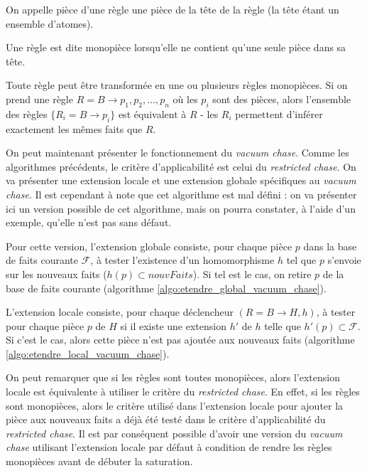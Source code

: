 \begin{definition}\label{def:piece_regle}
    On appelle pièce d’une règle une pièce de la tête de la règle (la tête étant un ensemble d'atomes).
    \par Une règle est dite monopièce lorsqu'elle ne contient qu'une seule pièce dans sa tête.
    \par Toute règle peut être transformée en une ou plusieurs règles monopièces. Si on prend une règle $R = B \rightarrow p_1, p_2, \ldots, p_n$ où les $p_i$ sont des pièces, alors l'ensemble des règles $\{R_i = B \rightarrow p_i\}$ est équivalent à $R$ - les $R_i$ permettent d'inférer exactement les mêmes faits que $R$.
\end{definition}
\par On peut maintenant présenter le fonctionnement du \textit{vacuum chase}. Comme les algorithmes précédents, le critère d'applicabilité est celui du \textit{restricted chase}. On va présenter une extension locale et une extension globale spécifiques au \textit{vacuum chase}. Il est cependant à note que cet algorithme est mal défini : on va présenter ici un version possible de cet algorithme, mais on pourra constater, à l'aide d'un exemple, qu'elle n'est pas sans défaut.
\par Pour cette version, l'extension globale consiste, pour chaque pièce $p$ dans la base de faits courante $\mathcal{F}$, à tester l'existence d'un homomorphisme $h$ tel que $p$ s'envoie sur les nouveaux faits ($h(p) \subset nouvFaits$). Si tel est le cas, on retire $p$ de la base de faits courante (algorithme \ref{algo:etendre_global_vacuum_chase}).
\par L'extension locale consiste, pour chaque déclencheur $(R = B \rightarrow H,h)$, à tester pour chaque pièce $p$ de $H$ si il existe une extension $h'$ de $h$ telle que $h'(p) \subset \mathcal{F}$. Si c'est le cas, alors cette pièce n'est pas ajoutée aux nouveaux faits (algorithme \ref{algo:etendre_local_vacuum_chase}). 
\par On peut remarquer que si les règles sont toutes monopièces, alors l'extension locale est équivalente à utiliser le critère du \textit{restricted chase}. En effet, si les règles sont monopièces, alors le critère utilisé dans l'extension locale pour ajouter la pièce aux nouveaux faits a déjà été testé dans le critère d'applicabilité du \textit{restricted chase}. Il est par conséquent possible d'avoir une version du \textit{vacuum chase} utilisant l'extension locale par défaut à condition de rendre les règles monopièces avant de débuter la saturation.


